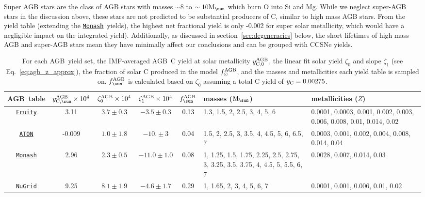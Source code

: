 \documentclass[fleqn,
referee, %
usenatbib]{mnras}
\newcommand{\fruity}{\texttt{\hyperlink{fruity}{Fruity}}}
\newcommand{\nugrid}{\texttt{\hyperlink{nugrid}{NuGrid}}}
\newcommand{\monash}{\texttt{\hyperlink{monash}{Monash}}}
\newcommand{\aton}{\texttt{\hyperlink{aton}{ATON}}}
\newcommand{\agb}{AGB}
\newcommand{\Yct}{{y_{\rm C}}}
\newcommand{\zetao}{\zeta_0}
\newcommand{\zetai}{\zeta_{1}}
\newcommand{\Mo}{ {\rm M}_{\sun}}
\begin{document}
Super AGB stars are the class of AGB stars with masses $\sim8$ to $\sim10\Mo$ which burn O into Si and Mg. While we neglect super-AGB stars in the discussion above, these stars are not predicted to be substantial producers of C, similar to high mass AGB stars. From the \citet{doherty+14, doherty+14b} yield table (extending the \monash\ yields), the highest net fractional yield is only -0.002 for super solar metallicity, which would have a negligible impact on the integrated yield). Additionally, as discussed in section~\ref{sec:degeneracies} below, the short lifetimes of high mass AGB and super-AGB stars mean they have minimally affect our conclusions and can be grouped with CCSNe yields.


\begin{table}
	\centering
    \caption[]{For each \agb\ yield set, the IMF-averaged \agb\ C yield at solar metallicity $y_{\rm C, 0}^{\rm AGB}$, the linear fit solar yield $\zetao$ and slope $\zetai$ (see Eq.~\ref{eq:agb_z_approx}), the fraction of solar C produced in the model $f_\odot^{\rm AGB}$, and the masses and metallicities each yield table is sampled on.
    $f_{\sun}^{\rm AGB}$ is calculated based on $\zetao$ assuming a total C yield of $\Yct = 0.00275$.
    }

	\label{tab:agb}
    \begin{tabular}{c  ccc  c p{4cm} p{4cm}} %
		\hline 
        \agb\ table 
                & $y_{\rm C, \sun}^{\rm AGB}\times10^4$ %
                & $\zetao^{\rm AGB}\times 10^4$ %
                & $\zetai^{\rm AGB}\times 10^4$
                &  $f_{\sun}^{\rm AGB}$
                & masses ($\Mo$) & metallicities ($Z$)\\
        \hline
        \fruity 
                & 3.11
                &  $3.7\pm0.3$
                & $-3.5\pm0.3$
                & 0.13
                & 1.3, 1.5, 2, 2.5, 3, 4, 5, 6
                & 0.0001, 0.0003, 0.001, 0.002, 0.003, 0.006, 0.008, 0.01, 0.014, 0.02
                \\
        \aton 
                & -0.009
                & $1.0\pm1.8$
                & $-10. \pm 3$
                & 0.04
                & 1.5, 2, 2.5, 3, 3.5, 4, 4.5, 5, 6, 6.5, 7
                & 0.0003, 0.001, 0.002, 0.004, 0.008, 0.014, 0.04
                \\
        \monash 
                &  2.96
                & $2.3 \pm 0.5$
                & $-11.0\pm 1.0$
                & 0.08
                & 1, 1.25, 1.5, 1.75, 2.25, 2.5, 2.75, 3, 3.25, 3.5, 3.75, 4, 4.5, 5, 5.5, 6, 7 
                & 0.0028, 0.007, 0.014, 0.03
                \\
        \nugrid 
                & 9.25
                & $8.1\pm 1.9$
                & $-4.6\pm1.7$
                & 0.29
                & 1, 1.65, 2, 3, 4, 5, 6, 7
                &  0.0001, 0.001, 0.006, 0.01, 0.02
                \\
		\hline
	\end{tabular}
\end{table}
\end{document}
